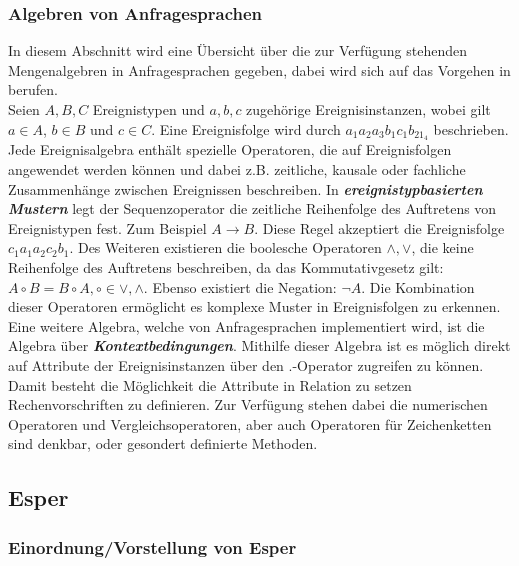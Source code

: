 \documentclass{acm_proc_article-sp}
\begin{document}
\subsubsection{Algebren von Anfragesprachen}
\vspace{0.1cm}
In diesem Abschnitt wird eine Übersicht über die zur Verfügung stehenden Mengenalgebren 
in Anfragesprachen gegeben, dabei wird sich auf das Vorgehen in \cite{bruns} berufen.\\
Seien $A,B,C$ Ereignistypen und $a,b,c$ zugehörige Ereignisinstanzen, wobei gilt 
$a \in A$, $b \in B$ und $c \in C$. Eine Ereignisfolge wird durch $a_1a_2a_3b_1c_1b_21_4$
beschrieben.\\
Jede Ereignisalgebra enthält spezielle Operatoren, die auf Ereignisfolgen angewendet 
werden können und dabei z.B. zeitliche, kausale oder fachliche Zusammenhänge zwischen 
Ereignissen beschreiben. In \textbf{\textit{ereignistypbasierten Mustern}} legt der 
Sequenzoperator die zeitliche Reihenfolge des Auftretens von Ereignistypen fest. Zum 
Beispiel $A \rightarrow B$. Diese Regel akzeptiert die Ereignisfolge $c_1a_1a_2c_2b_1$. 
Des Weiteren existieren die boolesche Operatoren $\land , \lor$, die keine Reihenfolge 
des Auftretens beschreiben, da das Kommutativgesetz gilt: $A \circ B = B \circ A, \circ 
\in {\lor,\land}$. Ebenso existiert die Negation: $\neg A$. Die Kombination dieser 
Operatoren ermöglicht es komplexe Muster in Ereignisfolgen zu erkennen.\\
Eine weitere Algebra, welche von Anfragesprachen implementiert wird, ist die Algebra über 
\textbf{\textit{Kontextbedingungen}}. Mithilfe dieser Algebra ist es möglich direkt 
auf Attribute der Ereignisinstanzen über den $.$-Operator zugreifen zu können. Damit 
besteht die Möglichkeit die Attribute in Relation zu setzen Rechenvorschriften zu 
definieren. Zur Verfügung stehen dabei die numerischen Operatoren und 
Vergleichsoperatoren, aber auch Operatoren für Zeichenketten sind denkbar, oder gesondert 
definierte Methoden. 



%
%
\subsection{Esper}
\vspace{0.1cm}
\subsubsection{Einordnung/Vorstellung  von Esper}
\vspace{0.1cm}
\end{document}
